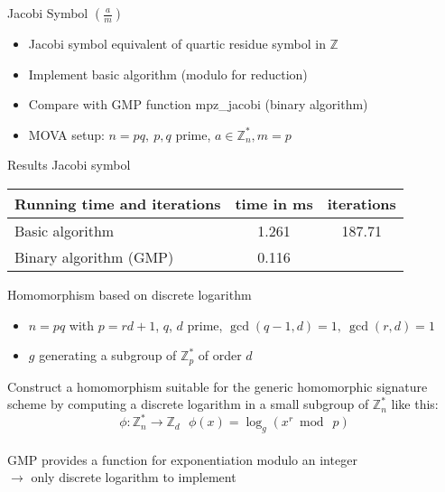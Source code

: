 \documentclass[a4, landscape, slidesonly]{seminar}
\renewcommand{\emph}[1]{{\color{emphcolor} #1}}
\newcommand{\slidetitle}[1]{{\large \color{titlecolor} #1}}
\begin{document}
\begin{slide}
\slidetitle{Jacobi Symbol $(\frac{a}{m})$}
\\[0.3cm]
\begin{itemize}
\item Jacobi symbol equivalent of quartic residue symbol in $\mathbb{Z}$
\item Implement basic algorithm (modulo for reduction)
\item Compare with GMP function \ttfamily mpz\_jacobi \sffamily (binary algorithm)
\item MOVA setup: $n=pq, ~p,q$ prime, $a \in \mathbb{Z}^*_n, m = p$\\
\end{itemize}
\emph{Results Jacobi symbol}
 \begin{table}[htb] 
 \begin{tabular}{|l c c|} 
 \hline 
Running time and iterations  &  {time in ms} &  {iterations}\\ 
 \hline  
 Basic algorithm & 1.261 & 187.71\\
 Binary algorithm (GMP) & 0.116 & \\
 \hline 
 \end{tabular}
 \end{table}
\end{slide}
\begin{slide}
\slidetitle{Homomorphism based on discrete logarithm}
\\[0.5cm]
\begin{itemize}
\item $n = pq$ with $p = rd + 1$, $q$, $d$ prime, $\gcd(q-1,d)=1,~\gcd(r,d)= 1$
\item $g$ generating a subgroup of $\mathbb{Z}^{*}_{p}$ of order $d$ \\
\end{itemize}
Construct a homomorphism suitable for the generic homomorphic signature scheme by computing a discrete logarithm in a small subgroup of $\mathbb{Z}^{*}_{n}$ like this: 
 \begin{displaymath} 
     \phi : \mathbb{Z}^{*}_{n} \to \mathbb{Z}_{d} ~~~\phi (x) = \log_g(x^r \bmod~ p) 
 \end{displaymath} \\ 
GMP provides a function for exponentiation modulo an integer\\
$\longrightarrow$ only discrete logarithm to implement
 
\end{slide}
\end{document}
